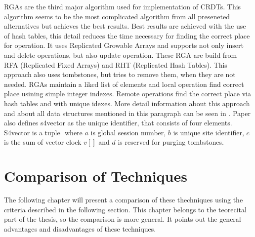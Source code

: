 \documentclass[12pt,oneside]{fithesis2}
\begin{document}
\par RGAs are the third major algorithm used for implementation of CRDTs. This algorithm seems to be the most complicated algorithm from all preseneted alternatives but achieves the best results. Best results are achieved with the use of hash tables, this detail reduces the time necessary for finding the correct place for operation.  It uses Replicated Growable Arrays and supports not only insert and delete operations, but also update operation. These RGA are build from RFA (Replicated Fixed Arrays) and RHT (Replicated Hash Tables). This approach also uses tombstones, but tries to remove them, when they are not needed. RGAs maintain a liked list of elements and local operation find correct place usining simple integer indexes. Remote operations find the correct place via hash tables and with unique idexes. More detail information about this approach and about all data structures mentioned in this paragraph can be seen in \cite{RGA}. Paper also defines s4vector as the unique identifier, that consists of four elements. S4vector is a tuple \(<a,b,c,d>\) where \(a\) is global session number, \(b\) is unique site identifier, \(c\) is the sum of vector clock \(v[]\) and \(d\) is reserved for purging tombstones. 
\chapter{Comparison of Techniques}
The following chapter will present a comparison of these thechniques using the criteria described in the following section. This chapter belongs to the teorecital part of the thesis, so the comparison is more general. It points out the general advantages and disadvantages of these techniques. 
\end{document}
